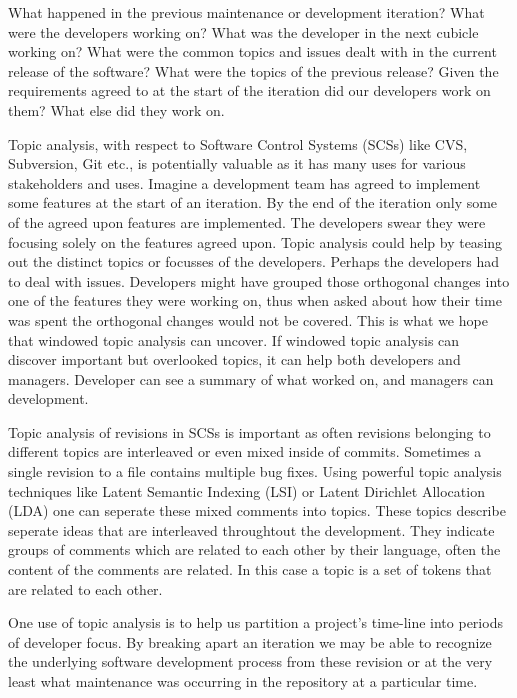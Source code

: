 \documentclass[times, 10pt,twocolumn]{article}
\begin{document}

What happened in the previous maintenance or development iteration? What were the developers
working on? What was the developer in the next cubicle working on?
What were the common topics and issues dealt with in the current
release of the software? What were the topics of the previous release?
Given the requirements agreed to at the start of the iteration did our
developers work on them? What else did they work on. 

Topic analysis, with respect to Software Control Systems (SCSs) like
CVS, Subversion, Git etc., is potentially valuable as it has many uses
for various stakeholders and uses.
Imagine a
development team has agreed to implement some features at the start of
an iteration. By the end of the iteration only some of the agreed upon
features are implemented. The developers swear they were focusing
solely on the features agreed upon. Topic analysis could help by
teasing out the distinct topics or focusses of the developers. Perhaps
the developers had to deal with issues.
Developers might have grouped those orthogonal changes into
one of the features they were working on, thus when asked about how
their time was spent the orthogonal changes would not be covered. This
is what we hope that windowed topic analysis can uncover. If windowed
topic analysis can discover important but overlooked topics, it can
help both developers and managers. Developer can see a
summary of what worked on, and managers can development.


Topic analysis of revisions in SCSs is important as often revisions
belonging to different topics are interleaved or even mixed inside of
commits.  Sometimes a single revision to a file contains multiple bug
fixes.  Using powerful topic analysis techniques like Latent Semantic
Indexing (LSI) or Latent Dirichlet Allocation (LDA) one can seperate
these mixed comments into topics. These topics describe seperate ideas
that are interleaved throughtout the development. They indicate groups
of comments which are related to each other by their language, often
the content of the comments are related.  In this case a topic is a
set of tokens that are related to each other.


One use of topic analysis is to help us partition a project's
time-line into periods  of developer focus. By breaking apart an
iteration we may be able to recognize the underlying software
development process from these revision or at the very least what
maintenance was occurring in the repository at a particular time.
\end{document}
